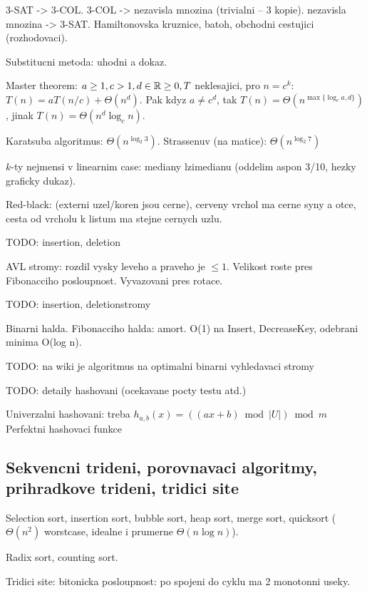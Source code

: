 3-SAT -> 3-COL.
3-COL -> nezavisla mnozina (trivialni -- 3 kopie).
nezavisla mnozina -> 3-SAT.
Hamiltonovska kruznice, batoh, obchodni cestujici (rozhodovaci).

Substitucni metoda: uhodni a dokaz.

Master theorem: $a\geq 1, c>1, d\in\mathbb{R}\geq 0, T$ neklesajici, pro $n=c^k$:
$T(n)=aT(n/c)+\Theta(n^d)$. Pak kdyz $a\neq c^d$, tak
$T(n)=\Theta(n^{\max\{\log_c a, d\}})$, jinak $T(n)=\Theta(n^d \log_c n)$.

Karatsuba algoritmus: $\Theta(n^{\log_2 3})$.
Strassenuv (na matice): $\Theta(n^{\log_2 7})$

\begin{understood}
$k$-ty nejmensi v linearnim case: mediany lzimedianu (oddelim aspon 3/10,
hezky graficky dukaz).
\end{understood}

Red-black: (externi uzel/koren jsou cerne), cerveny vrchol ma cerne
syny a otce, cesta od vrcholu k listum ma stejne cernych uzlu.

TODO: insertion, deletion

AVL stromy: rozdil vysky leveho a praveho je $\leq 1$.
Velikost roste pres Fibonacciho posloupnost.
Vyvazovani pres rotace.

TODO: insertion, deletionstromy

\begin{understood}
Binarni halda. Fibonacciho halda: amort. O(1) na Insert, DecreaseKey,
odebrani minima O(log n).
\end{understood}

TODO: na wiki je algoritmus na optimalni binarni vyhledavaci stromy

TODO: detaily hashovani (ocekavane pocty testu atd.)

Univerzalni hashovani: treba $h_{a,b}(x)=((ax+b)\bmod |U|) \bmod m$
Perfektni hashovaci funkce

\subsection{Sekvencni trideni, porovnavaci algoritmy, prihradkove trideni,
tridici site}
Selection sort, insertion sort, bubble sort, heap sort, merge sort, quicksort
($\Theta(n^2)$ worstcase, idealne i prumerne $\Theta(n\log n)$).

Radix sort, counting sort.

Tridici site: bitonicka posloupnost: po spojeni do cyklu ma 2 monotonni useky.

